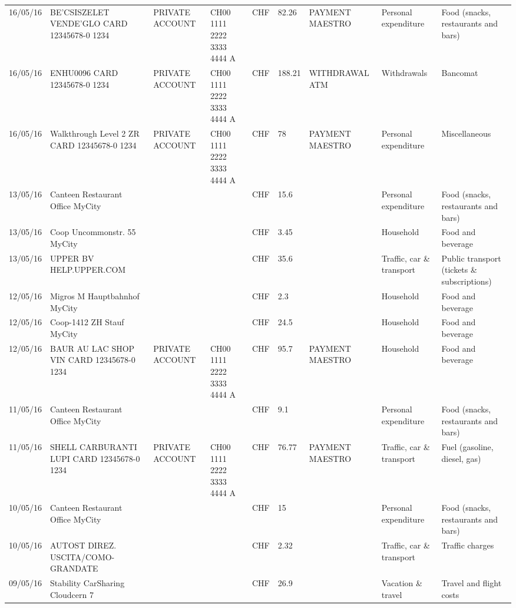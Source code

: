 \begin{landscape}
\begin{center}
\begin{longtable}{lllllllll}
		16/05/16 & BE'CSISZELET VENDE'GLO CARD 12345678-0 1234 & PRIVATE ACCOUNT & CH00 1111 2222 3333 4444 A & CHF   & 82.26 & PAYMENT MAESTRO & Personal expenditure & Food (snacks, restaurants and bars) \\
		16/05/16 & ENHU0096 CARD 12345678-0 1234 & PRIVATE ACCOUNT & CH00 1111 2222 3333 4444 A & CHF   & 188.21 & WITHDRAWAL ATM & Withdrawals & Bancomat \\
		16/05/16 & Walkthrough Level 2 ZR CARD 12345678-0 1234 & PRIVATE ACCOUNT & CH00 1111 2222 3333 4444 A & CHF   & 78    & PAYMENT MAESTRO & Personal expenditure & Miscellaneous \\
		13/05/16 & Canteen Restaurant Office      MyCity &       &       & CHF   & 15.6  &       & Personal expenditure & Food (snacks, restaurants and bars) \\
		13/05/16 & Coop Uncommonstr. 55   MyCity &       &       & CHF   & 3.45  &       & Household & Food and beverage \\
		13/05/16 & UPPER BV                  HELP.UPPER.COM &       &       & CHF   & 35.6  &       & Traffic, car \& transport & Public transport (tickets \& subscriptions) \\
		12/05/16 & Migros M Hauptbahnhof    MyCity &       &       & CHF   & 2.3   &       & Household & Food and beverage \\
		12/05/16 & Coop-1412 ZH Stauf       MyCity &       &       & CHF   & 24.5  &       & Household & Food and beverage \\
		12/05/16 & BAUR AU LAC SHOP VIN CARD 12345678-0 1234 & PRIVATE ACCOUNT & CH00 1111 2222 3333 4444 A & CHF   & 95.7  & PAYMENT MAESTRO & Household & Food and beverage \\
		11/05/16 & Canteen Restaurant Office      MyCity &       &       & CHF   & 9.1   &       & Personal expenditure & Food (snacks, restaurants and bars) \\
		11/05/16 & SHELL CARBURANTI LUPI CARD 12345678-0 1234 & PRIVATE ACCOUNT & CH00 1111 2222 3333 4444 A & CHF   & 76.77 & PAYMENT MAESTRO & Traffic, car \& transport & Fuel (gasoline, diesel, gas) \\
		10/05/16 & Canteen Restaurant Office      MyCity &       &       & CHF   & 15    &       & Personal expenditure & Food (snacks, restaurants and bars) \\
		10/05/16 & AUTOST DIREZ. USCITA/COMO-GRANDATE &       &       & CHF   & 2.32  &       & Traffic, car \& transport & Traffic charges \\
		09/05/16 & Stability CarSharing      Cloudcern 7 &       &       & CHF   & 26.9  &       & Vacation \& travel & Travel and flight costs \\

\end{longtable}
\end{center}
\end{landscape}

